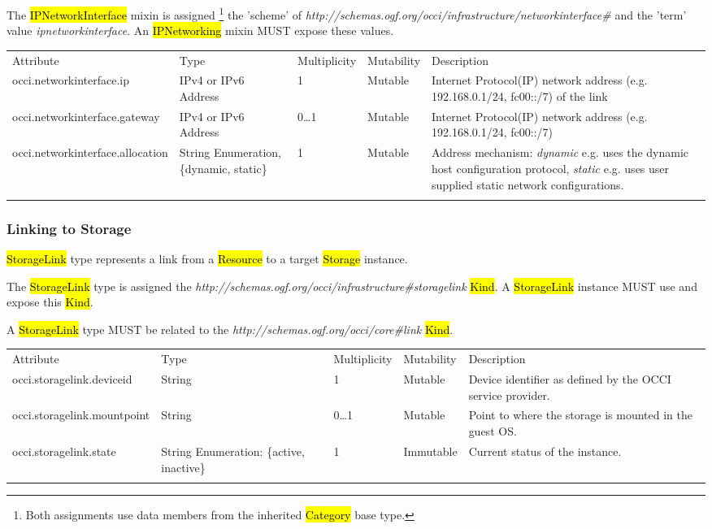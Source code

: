 \documentclass[10pt,a4paper]{article}
\begin{document}
The \hl{IPNetworkInterface} mixin is assigned 
\footnote{Both assignments use data members from the inherited \hl{Category} 
base type.} the 'scheme' of
\textit{http://schemas.ogf.org/occi/infrastructure/networkinterface\#} and the 'term' value 
\textit{ipnetworkinterface}. An \hl{IPNetworking} mixin MUST expose these values.

\begin{tabular}{lp{2.5cm}p{1cm}lp{6cm}}
\toprule
Attribute&Type&Multi\-plicity&Mutability&Description\\
\colrule
occi.networkinterface.ip & IPv4 or IPv6 Address & 1 & Mutable & Internet Protocol(IP) network address (e.g. 192.168.0.1/24, fc00::/7) of the link\\
occi.networkinterface.gateway & IPv4 or IPv6 Address & 0\ldots1 & Mutable & Internet Protocol(IP) network address (e.g. 192.168.0.1/24, fc00::/7)\\
occi.networkinterface.allocation & String Enumeration, \{dynamic, static\} & 1 & Mutable & Address mechanism: \textit{dynamic} e.g. uses the dynamic host configuration protocol, \textit{static} e.g. uses user supplied static network configurations.\\
\botrule
\end{tabular}

\subsubsection{Linking to Storage}
\hl{StorageLink} type represents a link from a \hl{Resource} to a target \hl{Storage} instance.

The \hl{StorageLink} type is assigned the  
\textit{http://schemas.ogf.org/occi/infrastructure\#storagelink} \hl{Kind}. A \hl{StorageLink}
instance MUST use and expose this \hl{Kind}. 

A \hl{StorageLink} type MUST be related to the \textit{http://schemas.ogf.org/occi/core\#link} \hl{Kind}.

{
	\begin{tabular}{lp{2.5cm}p{1cm}lp{6cm}}
	\toprule
	Attribute&Type&Multi\-plicity&Mutability&Description\\
	\colrule
	occi.storagelink.deviceid & String & 1 & Mutable 
	& Device identifier as defined by the OCCI service provider.\\
	occi.storagelink.mountpoint & String & 0\ldots1 & Mutable 
	& Point to where the storage is mounted in the guest OS.\\
	occi.storagelink.state & String Enumeration: \{active, inactive\}& 1 
	& Immutable & Current status of the instance.\\
	\botrule
	\end{tabular}
}
\end{document}
